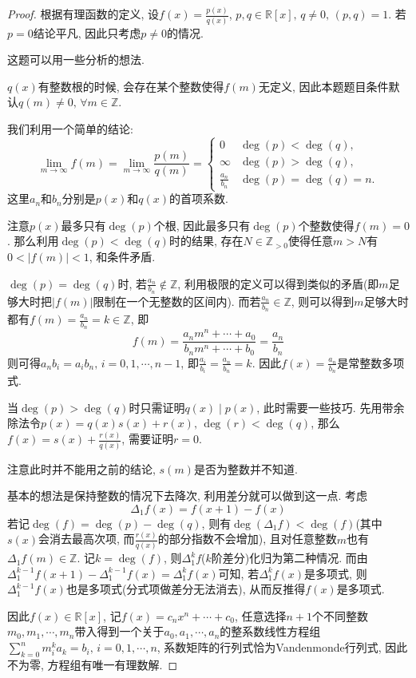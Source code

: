 \begin{proof}
    根据有理函数的定义, 设$f(x) = \frac{p(x)}{q(x)}$, $p, q \in \mathbb{R}[x],\, q \neq 0,\, (p, q) = 1$. 若$p = 0$结论平凡, 因此只考虑$p \neq 0$的情况.
    
    这题可以用一些分析的想法.
    \begin{remark}
        $q(x)$有整数根的时候, 会存在某个整数使得$f(m)$无定义, 因此本题题目条件默认$q(m) \neq 0,\, \forall m \in \mathbb{Z}$.
    \end{remark}
    我们利用一个简单的结论:
    \[
        \lim_{m \to \infty} f(m) = \lim_{m \to \infty} \frac{p(m)}{q(m)} =
        \begin{cases}
            0 & \deg(p) < \deg(q),\\
            \infty & \deg(p) > \deg(q),\\
            \frac{a_n}{b_n} & \deg(p) = \deg(q) = n.
        \end{cases}
    \]
    这里$a_n$和$b_n$分别是$p(x)$和$q(x)$的首项系数.

    注意$p(x)$最多只有$\deg(p)$个根, 因此最多只有$\deg(p)$个整数使得$f(m) = 0$. 那么利用$\deg(p) < \deg(q)$时的结果, 存在$N \in \mathbb{Z}_{>0}$使得任意$m > N$有$0 < |f(m)| < 1$, 和条件矛盾.

    $\deg(p) = \deg(q)$时, 若$\frac{a_n}{b_n} \notin \mathbb{Z}$, 利用极限的定义可以得到类似的矛盾(即$m$足够大时把$|f(m)|$限制在一个无整数的区间内). 而若$\frac{a_n}{b_n} \in \mathbb{Z}$, 则可以得到$m$足够大时都有$f(m) = \frac{a_n}{b_n} = k \in \mathbb{Z}$, 即
    \[
        f(m) = \frac{a_nm^n + \cdots + a_0}{b_nm^n + \cdots + b_0} = \frac{a_n}{b_n} 
    \]
    则可得$a_nb_i = a_ib_n,\, i = 0, 1, \cdots, n - 1$, 即$\frac{a_i}{b_i} = \frac{a_n}{b_n} = k$. 因此$f(x) = \frac{a_n}{b_n}$是常整数多项式.

    当$\deg(p) > \deg(q)$时只需证明$q(x) \mid p(x)$, 此时需要一些技巧. 先用带余除法令$p(x) = q(x)s(x) + r(x),\, \deg(r) < \deg(q)$, 那么$f(x) = s(x) + \frac{r(x)}{q(x)}$, 需要证明$r = 0$.
    \begin{remark}
        注意此时并不能用之前的结论, $s(m)$是否为整数并不知道.
    \end{remark}
    基本的想法是保持整数的情况下去降次, 利用差分就可以做到这一点. 考虑
    \[
        \Delta_1 f(x) = f(x + 1) - f(x) 
    \]
    若记$\deg(f) = \deg(p) - \deg(q)$, 则有$\deg(\Delta_1 f) < \deg(f)$(其中$s(x)$会消去最高次项, 而$\frac{r(x)}{q(x)}$的部分指数不会增加), 且对任意整数$m$也有$\Delta_1 f(m) \in \mathbb{Z}$. 记$k = \deg(f)$, 则$\Delta_1^k f$($k$阶差分)化归为第二种情况. 而由$\Delta_1^{k - 1} f(x + 1) - \Delta_1^{k - 1} f(x) = \Delta_1^k f(x)$可知, 若$\Delta_1^k f(x)$是多项式, 则$\Delta_1^{k - 1} f(x)$也是多项式(分式项做差分无法消去), 从而反推得$f(x)$是多项式.

    因此$f(x) \in \mathbb{R}[x]$, 记$f(x) = c_nx^n + \cdots + c_0$, 任意选择$n + 1$个不同整数$m_0, m_1, \cdots, m_n$带入得到一个关于$a_0, a_1, \cdots, a_n$的整系数线性方程组$\sum_{k = 0}^{n} m_i^ka_k = b_i,\, i = 0, 1, \cdots, n$, 系数矩阵的行列式恰为Vandenmonde行列式, 因此不为零, 方程组有唯一有理数解.
\end{proof}